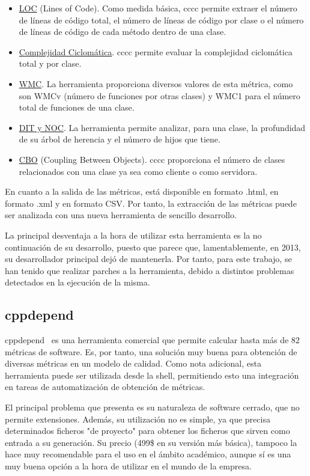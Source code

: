\documentclass[11pt]{article}
\begin{document}
\begin{itemize}
\item{\underline{LOC} (Lines of Code)}. Como medida básica, cccc permite extraer el número de líneas de código total, el número de líneas de código por clase o el número de líneas de código de cada método dentro de una clase.
\item{\underline{Complejidad Ciclomática}}. cccc permite evaluar la complejidad ciclomática total y por clase.
\item{\underline{WMC}}. La herramienta proporciona diversos valores de esta métrica, como son WMCv (número de funciones por otras clases) y WMC1 para el número total de funciones de una clase.
\item{\underline{DIT y NOC}}. La herramienta permite analizar, para una clase, la profundidad de su árbol de herencia y el número de hijos que tiene.
\item{\underline{CBO} (Coupling Between Objects)}. cccc proporciona el número de clases relacionados con una clase ya sea como cliente o como servidora.

\end{itemize}

En cuanto a la salida de las métricas, está disponible en formato .html, en formato .xml y en formato CSV. Por tanto, la extracción de las métricas puede ser analizada con una nueva herramienta de sencillo desarrollo.

La principal desventaja a la hora de utilizar esta herramienta es la no continuación de su desarrollo, puesto que parece que, lamentablemente, en 2013, su desarrollador principal dejó de mantenerla. Por tanto, para este trabajo, se han tenido que realizar parches a la herramienta, debido a distintos problemas detectados en la ejecución de la misma.

\subsection{cppdepend}

cppdepend~\cite{metrictools:cppdepend} es una herramienta comercial que permite calcular hasta más de 82 métricas de software. Es, por tanto, una solución muy buena para obtención de diversas métricas en un modelo de calidad. Como nota adicional, esta herramienta puede ser utilizada desde la shell, permitiendo esto una integración en tareas de automatización de obtención de métricas.

El principal problema que presenta es su naturaleza de software cerrado, que no permite extensiones. Además, su utilización no es simple, ya que precisa determinados ficheros "de proyecto" para obtener los ficheros que sirven como entrada a su generación. Su precio (499\$ en su versión más básica), tampoco la hace muy recomendable para el uso en el ámbito académico, aunque sí es una muy buena opción a la hora de utilizar en el mundo de la empresa.
\end{document}
